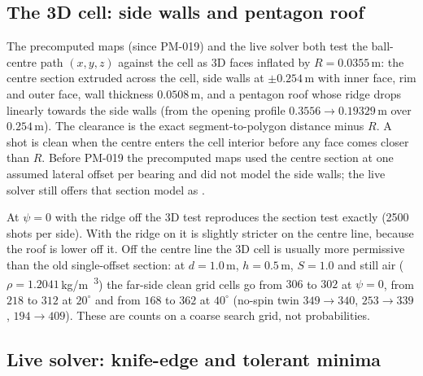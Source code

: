 \subsection{The 3D cell: side walls and pentagon roof}
\label{sec:field-cell3d}

The precomputed maps (since PM-019) and the live solver both test the ball-centre path $(x,y,z)$
against the cell as 3D faces inflated by $R=0.0355$\,\unit{m}\confirmed: the centre section extruded across the cell,
side walls at $\pm0.254$\,\unit{m}\confirmed{} with inner face, rim and outer face, wall thickness
$0.0508$\,\unit{m}\assumed, and a pentagon roof whose ridge drops linearly towards the side walls
(from the opening profile $0.3556\to0.19329$\,\unit{m} over $0.254$\,\unit{m}\derived). The
clearance is the exact segment-to-polygon distance minus $R$. A shot is clean when the centre enters
the cell interior before any face comes closer than $R$. Before PM-019 the precomputed maps used the
centre section at one assumed lateral offset per bearing and did not model the side walls; the live
solver still offers that section model as .

At $\psi=0$ with the ridge off the 3D test reproduces the section test exactly (2500 shots per side).
With the ridge on it is slightly stricter on the centre line, because the roof is lower off it. Off
the centre line the 3D cell is usually more permissive than the old single-offset section: at
$d=1.0$\,\unit{m}\assumed, $h=0.5$\,\unit{m}\assumed, $S=1.0$\assumed{} and still air
($\rho=1.2041$\,\unit{kg/m\textsuperscript{3}}\derived) the far-side clean grid cells go from $306$ to $302$ at
$\psi=0$, from $218$ to $312$ at $20^\circ$ and from $168$ to $362$ at $40^\circ$\predicted{} (no-spin
twin $349\to340$, $253\to339$, $194\to409$\predicted). These are counts on a coarse search grid, not
probabilities.

\subsection{Live solver: knife-edge and tolerant minima}
\label{sec:field-solver}

